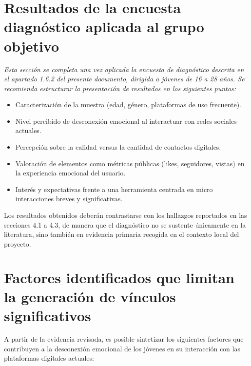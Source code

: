 \section{Resultados de la encuesta diagnóstico aplicada al grupo objetivo}
\textit{Esta sección se completa una vez aplicada la encuesta de diagnóstico descrita en el apartado 1.6.2 del presente documento, dirigida a jóvenes de 16 a 28 años. Se recomienda estructurar la presentación de resultados en los siguientes puntos:}

\begin{itemize}
    \item Caracterización de la muestra (edad, género, plataformas de uso frecuente).
    \item Nivel percibido de desconexión emocional al interactuar con redes sociales actuales.
    \item Percepción sobre la calidad versus la cantidad de contactos digitales.
    \item Valoración de elementos como métricas públicas (likes, seguidores, vistas) en la experiencia emocional del usuario.
    \item Interés y expectativas frente a una herramienta centrada en micro interacciones breves y significativas.
\end{itemize}

Los resultados obtenidos deberán contrastarse con los hallazgos reportados en las secciones 4.1 a 4.3, de manera que el diagnóstico no se sustente únicamente en la literatura, sino también en evidencia primaria recogida en el contexto local del proyecto.

\section{Factores identificados que limitan la generación de vínculos significativos}
A partir de la evidencia revisada, es posible sintetizar los siguientes factores que contribuyen a la desconexión emocional de los jóvenes en su interacción con las plataformas digitales actuales:

